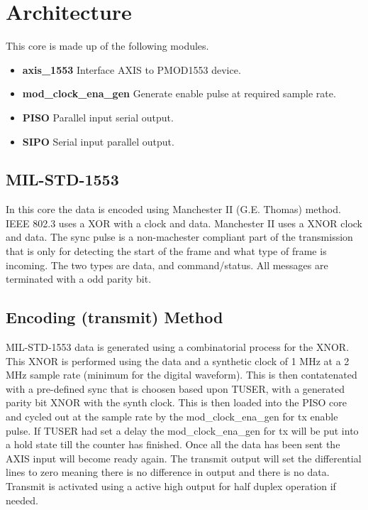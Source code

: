 \section{Architecture}
\par
This core is made up of the following modules.
\begin{itemize} 
  \item \textbf{axis\_1553} Interface AXIS to PMOD1553 device.
  \item \textbf{mod\_clock\_ena\_gen} Generate enable pulse at required sample rate.
  \item \textbf{PISO} Parallel input serial output.
  \item \textbf{SIPO} Serial input parallel output.
\end{itemize}

\subsection{MIL-STD-1553}
\par
In this core the data is encoded using Manchester II (G.E. Thomas) method. IEEE 802.3 uses a XOR with a clock and data. Manchester II uses a XNOR clock and data. The sync pulse is a non-machester compliant
part of the transmission that is only for detecting the start of the frame and what type of frame is incoming. The two types are data, and command/status. All messages are terminated with a odd parity bit.

\subsection{Encoding (transmit) Method}
\par
MIL-STD-1553 data is generated using a combinatorial process for the XNOR. This XNOR is performed using the data and a synthetic clock of 1 MHz at a 2 MHz sample rate (minimum for the digital waveform).
This is then contatenated with a pre-defined sync that is choosen based upon TUSER, with a generated parity bit XNOR with the synth clock. This is then loaded into the PISO core and cycled out at the sample
rate by the mod\_clock\_ena\_gen for tx enable pulse. If TUSER had set a delay the mod\_clock\_ena\_gen for tx will be put into a hold state till the counter has finished. Once all the data has been sent the
AXIS input will become ready again. The transmit output will set the differential lines to zero meaning there is no difference in output and there is no data. Transmit is activated using a active high output
for half duplex operation if needed.

